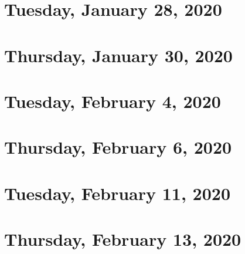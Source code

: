 \documentclass{../mynotes}
\begin{document}
\section{Tuesday, January 28, 2020}
    
\section{Thursday, January 30, 2020}
    

\section{Tuesday, February 4, 2020}
    
\section{Thursday, February 6, 2020}
    
    
\section{Tuesday, February 11, 2020}
    
\section{Thursday, February 13, 2020}
    

%     
\end{document}
